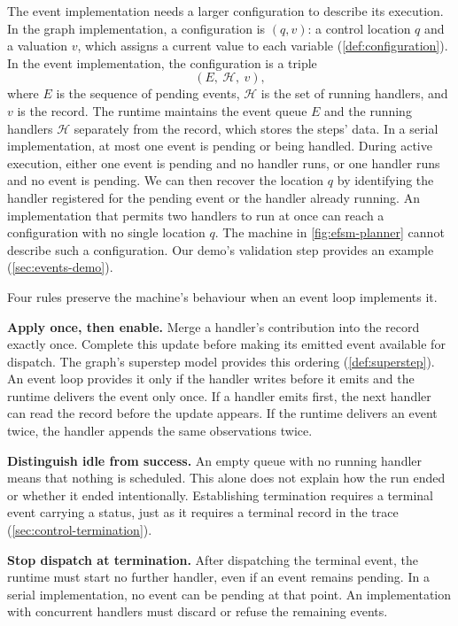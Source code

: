 The event implementation needs a larger configuration to describe its execution. In the graph
implementation, a configuration is $(q, v)$: a control location $q$ and a valuation $v$, which
assigns a current value to each variable (\cref{def:configuration}). In the event implementation,
the configuration is a triple
\[
  (E,\ \mathcal{H},\ v),
\]
where $E$ is the sequence of pending events, $\mathcal{H}$ is the set of running handlers, and $v$
is the record. The runtime maintains the event queue $E$ and the running handlers $\mathcal{H}$
separately from the record, which stores the steps' data. In a serial implementation, at most one
event is pending or being handled. During active execution, either one event is pending and no
handler runs, or one handler runs and no event is pending. We can then recover the location $q$
by identifying the handler registered for the pending event or the handler already running. An
implementation that permits two handlers to run at once can reach a configuration with no single
location $q$. The machine in \cref{fig:efsm-planner} cannot describe such a configuration. Our
demo's validation step provides an example (\cref{sec:events-demo}).

Four rules preserve the machine's behaviour when an event loop implements it.

\bi

\item \textbf{Apply once, then enable.} Merge a handler's contribution into the record exactly
once. Complete this update before making its emitted event available for dispatch. The graph's
superstep model provides this ordering (\cref{def:superstep}). An event loop provides it only if
the handler writes before it emits and the runtime delivers the event only once. If a handler
emits first, the next handler can read the record before the update appears. If the runtime
delivers an event twice, the handler appends the same observations twice.

\item \textbf{Distinguish idle from success.} An empty queue with no running handler means that
nothing is scheduled. This alone does not explain how the run ended or whether it ended
intentionally. Establishing termination requires a terminal event carrying a status, just as it
requires a terminal record in the trace (\cref{sec:control-termination}).

\item \textbf{Stop dispatch at termination.} After dispatching the terminal event, the runtime
must start no further handler, even if an event remains pending. In a serial implementation, no
event can be pending at that point. An implementation with concurrent handlers must discard or
refuse the remaining events.

